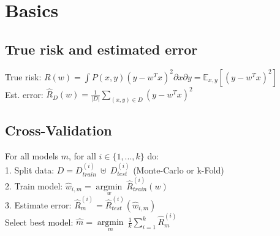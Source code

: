\section*{Basics}


\subsection*{True risk and estimated error}
True risk: $R(w) = \int P(x,y) (y-w^Tx)^2 \partial x \partial y = \mathbb{E}_{x,y}[(y-w^Tx)^2]$ \\
Est. error: $\hat{R}_D(w) = \frac{1}{|D|}\sum_{(x,y)\in D} (y-w^Tx)^2$


\subsection*{Cross-Validation}
For all models $m$, for all $i \in \{ 1, ..., k \}$ do:\\
1. Split data: $D = D_{train}^{(i)} ~ \uplus ~ D_{test}^{(i)} $ (Monte-Carlo or k-Fold) \\
2. Train model: $\hat{w}_{i,m} = \underset{w}{\operatorname{argmin}} ~ \hat{R}_{train}^{(i)} (w)$ \\
3. Estimate error: $\hat{R}_{m}^{(i)} = \hat{R}_{test}^{(i)} (\hat{w}_{i,m})$ \\
Select best model: $\hat{m} = \underset{m}{\operatorname{argmin}} ~ \frac{1}{k} \sum_{i=1}^{k} \hat{R}_{m}^{(i)}$


